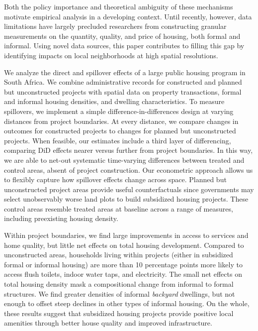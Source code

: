 \documentclass[12pt]{article}
\begin{document}
Both the policy importance and theoretical ambiguity of these mechanisms motivate empirical analysis in a developing context.  Until recently, however, data limitations have largely precluded researchers from constructing granular measurements on the quantity, quality, and price of housing, both formal and informal. Using novel data sources, this paper contributes to filling this gap by identifying impacts on local neighborhoods at high spatial resolutions.   

We analyze the direct and spillover effects of a large public housing program in South Africa.  We combine administrative records for constructed and planned but unconstructed projects with spatial data on property transactions, formal and informal housing densities, and dwelling characteristics.  To measure spillovers, we implement a simple difference-in-differences design at varying distances from pro\-ject boundaries.  At every distance, we compare changes in outcomes for constructed projects to changes for planned but unconstructed projects. When feasible, our estimates include a third layer of differencing, comparing DiD effects nearer versus further from project boundaries. In this way, we are able to net-out systematic time-varying differences between treated and control areas, absent of project construction. Our econometric approach allows us to flexibly capture how spillover effects change across space.  Planned but unconstructed project areas provide useful counterfactuals since governments may select unobservably worse land plots to build subsidized housing projects.  These control areas resemble treated areas at baseline across a range of measures, including preexisting housing density.  


Within project boundaries, we find large improvements in access to services and home quality, but little net effects on total housing development. Compared to unconstructed areas, households living within projects (either in subsidized formal or informal housing) are more than 10 percentage points more likely to access flush toilets, indoor water taps, and electricity. The small net effects on total housing density mask a compositional change from informal to formal structures. We find greater densities of informal {\it backyard} dwellings, but not enough to offset steep declines in other types of informal housing. On the whole, these results suggest that subsidized housing projects provide positive local amenities through better house quality and improved infrastructure.
\end{document}
